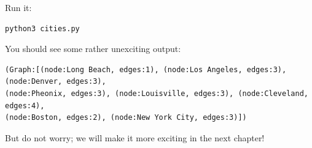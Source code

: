 Run it:
\begin{verbatim}
python3 cities.py
\end{verbatim}

You should see some rather unexciting output:

\begin{verbatim}
(Graph:[(node:Long Beach, edges:1), (node:Los Angeles, edges:3), (node:Denver, edges:3),
(node:Pheonix, edges:3), (node:Louisville, edges:3), (node:Cleveland, edges:4),
(node:Boston, edges:2), (node:New York City, edges:3)])
\end{verbatim}

But do not worry; we will make it more exciting in the next chapter!
